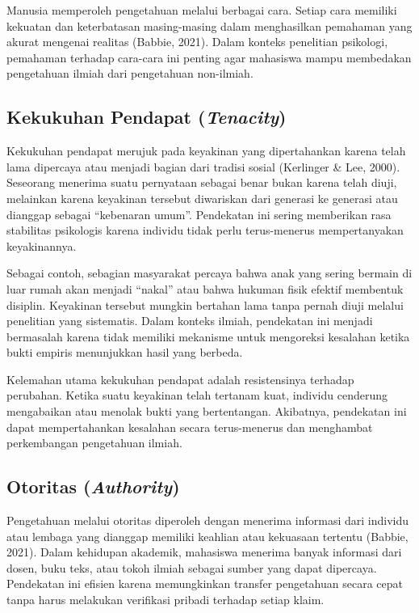 \documentclass[
  indonesian,
  letterpaper,
  DIV=11,
  numbers=noendperiod]{scrreprt}
\begin{document}
Manusia memperoleh pengetahuan melalui berbagai cara. Setiap cara
memiliki kekuatan dan keterbatasan masing-masing dalam menghasilkan
pemahaman yang akurat mengenai realitas (Babbie, 2021). Dalam konteks
penelitian psikologi, pemahaman terhadap cara-cara ini penting agar
mahasiswa mampu membedakan pengetahuan ilmiah dari pengetahuan
non-ilmiah.

\subsection{\texorpdfstring{Kekukuhan Pendapat
(\emph{Tenacity})}{Kekukuhan Pendapat (Tenacity)}}\label{kekukuhan-pendapat-tenacity}

Kekukuhan pendapat merujuk pada keyakinan yang dipertahankan karena
telah lama dipercaya atau menjadi bagian dari tradisi sosial (Kerlinger
\& Lee, 2000). Seseorang menerima suatu pernyataan sebagai benar bukan
karena telah diuji, melainkan karena keyakinan tersebut diwariskan dari
generasi ke generasi atau dianggap sebagai ``kebenaran umum''.
Pendekatan ini sering memberikan rasa stabilitas psikologis karena
individu tidak perlu terus-menerus mempertanyakan keyakinannya.

Sebagai contoh, sebagian masyarakat percaya bahwa anak yang sering
bermain di luar rumah akan menjadi ``nakal'' atau bahwa hukuman fisik
efektif membentuk disiplin. Keyakinan tersebut mungkin bertahan lama
tanpa pernah diuji melalui penelitian yang sistematis. Dalam konteks
ilmiah, pendekatan ini menjadi bermasalah karena tidak memiliki
mekanisme untuk mengoreksi kesalahan ketika bukti empiris menunjukkan
hasil yang berbeda.

Kelemahan utama kekukuhan pendapat adalah resistensinya terhadap
perubahan. Ketika suatu keyakinan telah tertanam kuat, individu
cenderung mengabaikan atau menolak bukti yang bertentangan. Akibatnya,
pendekatan ini dapat mempertahankan kesalahan secara terus-menerus dan
menghambat perkembangan pengetahuan ilmiah.

\subsection{\texorpdfstring{Otoritas
(\emph{Authority})}{Otoritas (Authority)}}\label{otoritas-authority}

Pengetahuan melalui otoritas diperoleh dengan menerima informasi dari
individu atau lembaga yang dianggap memiliki keahlian atau kekuasaan
tertentu (Babbie, 2021). Dalam kehidupan akademik, mahasiswa menerima
banyak informasi dari dosen, buku teks, atau tokoh ilmiah sebagai sumber
yang dapat dipercaya. Pendekatan ini efisien karena memungkinkan
transfer pengetahuan secara cepat tanpa harus melakukan verifikasi
pribadi terhadap setiap klaim.
\end{document}
